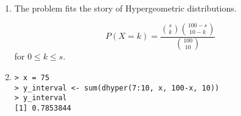 \begin{enumerate}[label=(\alph*)]
\item The problem fits the story of Hypergeometric distributions.

$$P(X = k) = \frac{\binom{s}{k}\binom{100-s}{10-k}}{\binom{100}{10}}$$
for $0 \leq k \leq s$.

\item 
\begin{verbatim}
> x = 75
> y_interval <- sum(dhyper(7:10, x, 100-x, 10))
> y_interval
[1] 0.7853844
\end{verbatim}
\end{enumerate}
